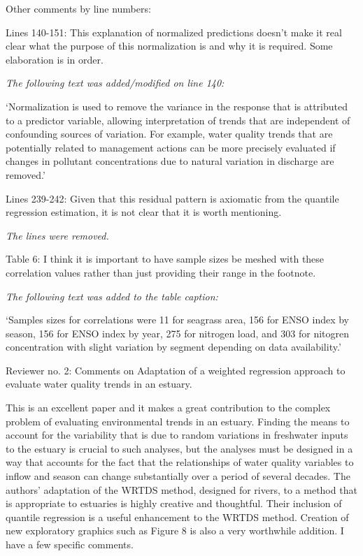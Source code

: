 \documentclass[letterpaper,12pt,oneside]{article}\usepackage[]{graphicx}\usepackage[]{color}
\begin{document}
Other comments by line numbers:

Lines 140-151:  This explanation of normalized predictions doesn't make it real clear what the purpose of this normalization is and why it is required.  Some elaboration is in order. 

{\it The following text was added/modified on line 140: 

`Normalization is used to remove the variance in the response that is attributed to a predictor variable, allowing interpretation of trends that are independent of confounding sources of variation. For example, water quality trends that are potentially related to management actions can be more precisely evaluated if changes in pollutant concentrations due to natural variation in discharge are removed.'}

Lines 239-242:  Given that this residual pattern is axiomatic from the quantile regression estimation, it is not clear that it is worth mentioning. 

{\it The lines were removed.}

Table 6:  I think it is important to have sample sizes be meshed with these correlation values rather than just providing their range in the footnote.

{\it The following text was added to the table caption:

`Samples sizes for correlations were 11 for seagrass area, 156 for ENSO index by season, 156 for ENSO index by year, 275 for nitrogen load, and 303 for nitogren concentration with slight variation by segment depending on data availability.'}
 

Reviewer no. 2: Comments on Adaptation of a weighted regression approach to evaluate water quality trends in an estuary.

This is an excellent paper and it makes a great contribution to the complex problem of evaluating environmental trends in an estuary.  Finding the means to account for the variability that is due to random variations in freshwater inputs to the estuary is crucial to such analyses, but the analyses must be designed in a way that accounts for the fact that the relationships of water quality variables to inflow and season can change substantially over a period of several decades.  The authors' adaptation of the WRTDS method, designed for rivers, to a method that is appropriate to estuaries is highly creative and thoughtful.  Their inclusion of quantile regression is a useful enhancement to the WRTDS method.  Creation of new exploratory graphics such as Figure 8 is also a very worthwhile addition.  I have a few specific comments.
\end{document}
